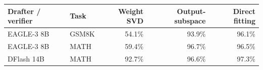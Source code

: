 \begin{tabular}{llrrr}
\toprule
Drafter / verifier & Task & Weight SVD & Output-subspace & Direct fitting \\
\midrule
EAGLE-3 8B & GSM8K & 54.1\% & 93.9\% & 96.1\% \\
EAGLE-3 8B & MATH & 59.4\% & 96.7\% & 96.5\% \\
DFlash 14B & MATH & 92.7\% & 96.6\% & 97.3\% \\
\bottomrule
\end{tabular}
